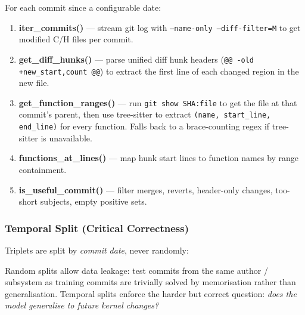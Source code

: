 \documentclass[11pt,a4paper]{article}
\begin{document}
For each commit since a configurable date:

\begin{enumerate}[leftmargin=2em, itemsep=2pt]
  \item \textbf{iter\_commits()} --- stream git log with
        \texttt{--name-only --diff-filter=M} to get modified C/H files per commit.
  \item \textbf{get\_diff\_hunks()} --- parse unified diff hunk headers
        (\texttt{@@ -old +new\_start,count @@}) to extract the first line of
        each changed region in the new file.
  \item \textbf{get\_function\_ranges()} --- run \texttt{git show SHA:file} to
        get the file at that commit's parent, then use tree-sitter to extract
        \texttt{(name, start\_line, end\_line)} for every function. Falls back
        to a brace-counting regex if tree-sitter is unavailable.
  \item \textbf{functions\_at\_lines()} --- map hunk start lines to function
        names by range containment.
  \item \textbf{is\_useful\_commit()} --- filter merges, reverts, header-only
        changes, too-short subjects, empty positive sets.
\end{enumerate}

\subsubsection{Temporal Split (Critical Correctness)}

Triplets are split by \emph{commit date}, never randomly:

\begin{center}
\end{center}

Random splits allow data leakage: test commits from the same author / subsystem
as training commits are trivially solved by memorisation rather than
generalisation. Temporal splits enforce the harder but correct question:
\textit{does the model generalise to future kernel changes?}
\end{document}
